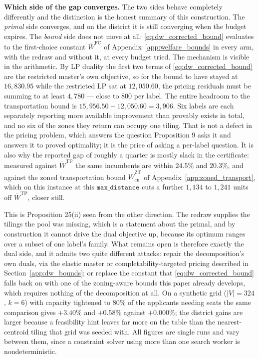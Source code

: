 \documentclass{article}
\begin{document}
\noindent\textbf{Which side of the gap converges.} The two sides behave
completely differently and the distinction is the honest summary of this
construction. The \emph{primal} side converges, and on the district it is still
converging when the budget expires. The \emph{bound} side does not move at all:
\eqref{eq:dw_corrected_bound} evaluates to the first-choice constant
$\overline W^{\mathrm{FC}}$ of Appendix~\ref{app:welfare_bounds} in every arm,
with the redraw and without it, at every budget tried. The mechanism is visible
in the arithmetic. By LP duality the first two terms of
\eqref{eq:dw_corrected_bound} are the restricted master's own objective, so for
the bound to have stayed at $16{,}830.95$ while the restricted LP sat at
$12{,}050.60$, the pricing residuals must be summing to at least $4{,}780$ ---
close to $800$ per label. The entire headroom to the transportation bound is
$15{,}956.50 - 12{,}050.60 = 3{,}906$. Six labels are each separately reporting
more available improvement than provably exists in total, and no six of the
zones they return can occupy one tiling. That is not a defect in the pricing
problem, which answers the question Proposition 9 asks it and answers it to
proved optimality; it is the price of asking a per-label question. It is also
why the reported gap of roughly a quarter is mostly slack in the certificate:
measured against $\overline W^{\mathrm{TP}}$ the same incumbents are within
$24.5\%$ and $20.3\%$, and against the zoned transportation bound
$\widehat W^{\mathrm{ZT}}_{\mathrm{cn}}$ of Appendix~\ref{app:zoned_transport},
which on this instance at this $\texttt{max\_distance}$ cuts a further $1{,}134$
to $1{,}241$ units off $\overline W^{\mathrm{TP}}$, closer still.

This is Proposition 25(ii) seen from the other direction. The redraw supplies
the tilings the pool was missing, which is a statement about the primal, and by
construction it cannot drive the dual objective up, because its optimum ranges
over a subset of one label's family. What remains open is therefore exactly the
dual side, and it admits two quite different attacks: repair the decomposition's
own duals, via the elastic master or completability-targeted pricing described
in Section~\ref{app:dw_bounds}; or replace the constant that
\eqref{eq:dw_corrected_bound} falls back on with one of the zoning-aware bounds
this paper already develops, which requires nothing of the decomposition at
all. On a synthetic grid ($|V| = 324$, $k = 6$) with capacity tightened to
$80\%$ of the applicants needing seats the same comparison gives $+3.40\%$ and
$+0.58\%$ against $+0.000\%$; the district gains are larger because a
feasibility hint leaves far more on the table than the nearest-centroid tiling
that grid was seeded with. All figures are single runs and vary between them,
since a constraint solver using more than one search worker is
nondeterministic.
\end{document}
